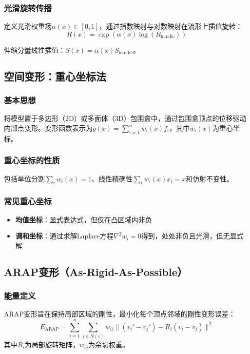 \documentclass[12pt]{article}
\begin{document}
\subsubsection{光滑旋转传播}
定义光滑权重场$\alpha(x) \in [0,1]$，通过指数映射与对数映射在流形上插值旋转：
\[
R(x) = \exp\left( \alpha(x) \log(R_{\text{handle}}) \right)
\]

伸缩分量线性插值：$S(x) = \alpha(x) S_{\text{handle}}$。

\subsection{空间变形：重心坐标法}

\subsubsection{基本思想}
将模型置于多边形（2D）或多面体（3D）包围盒中，通过包围盒顶点的位移驱动内部点变形。变形函数表示为$g(x) = \sum_{i=1}^n w_i(x) f_i$，其中$w_i(x)$为重心坐标。

\subsubsection{重心坐标的性质}
包括单位分割$\sum_i w_i(x) = 1$、线性精确性$\sum_i w_i(x) x_i = x$和仿射不变性。

\subsubsection{常见重心坐标}
\begin{itemize}
    \item \textbf{均值坐标}：显式表达式，但仅在凸区域内非负
    \item \textbf{调和坐标}：通过求解Laplace方程$\nabla^2 w_i = 0$得到，处处非负且光滑，但无显式解
\end{itemize}

\subsection{ARAP变形（As-Rigid-As-Possible）}

\subsubsection{能量定义}
ARAP变形旨在保持局部区域的刚性，最小化每个顶点邻域的刚性变形误差：
\[
E_{\text{ARAP}} = \sum_{i=1}^n \sum_{j \in N(i)} w_{ij} \| (v_i' - v_j') - R_i (v_i - v_j) \|^2
\]
其中$R_i$为局部旋转矩阵，$w_{ij}$为余切权重。
\end{document}
